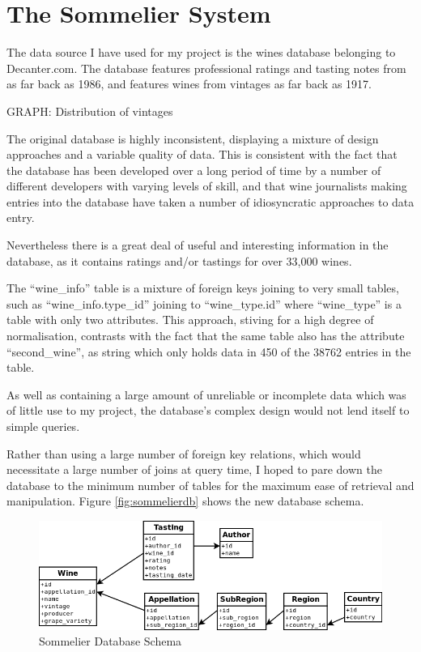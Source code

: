 \section{The Sommelier System}\label{design}


The data source I have used for my project is the wines database belonging to Decanter.com\cite{DecanterCom}. The database features professional ratings and tasting notes from as far back as 1986, and features wines from vintages as far back as 1917.

GRAPH: Distribution of vintages

The original database is highly inconsistent, displaying a mixture of design approaches and a variable quality of data. This is consistent with the fact that the database has been developed over a long period of time by a number of different developers with varying levels of skill, and that wine journalists making entries into the database have taken a number of idiosyncratic approaches to data entry.

Nevertheless there is a great deal of useful and interesting information in the database, as it contains ratings and/or tastings for over 33,000 wines.

The ``wine\_info'' table is a mixture of foreign keys joining to very small tables, such as ``wine\_info.type\_id'' joining to ``wine\_type.id'' where ``wine\_type'' is a table with only two attributes. This approach, stiving for a high degree of normalisation, contrasts with the fact that the same table also has the attribute ``second\_wine'', as string which only holds data in 450 of the 38762 entries in the table.


As well as containing a large amount of unreliable or incomplete data which was of little use to my project, the database's complex design would not lend itself to simple queries. 

Rather than using a large number of foreign key relations, which would necessitate a large number of joins at query time, I hoped to pare down the database to the minimum number of tables for the maximum ease of retrieval and manipulation. Figure \ref{fig:sommelierdb} shows the new database schema.

\begin{figure}[h!]
    \caption{Sommelier Database Schema}
    \centering
        \includegraphics[width=14cm]{SommelierDB}
\end{figure}

